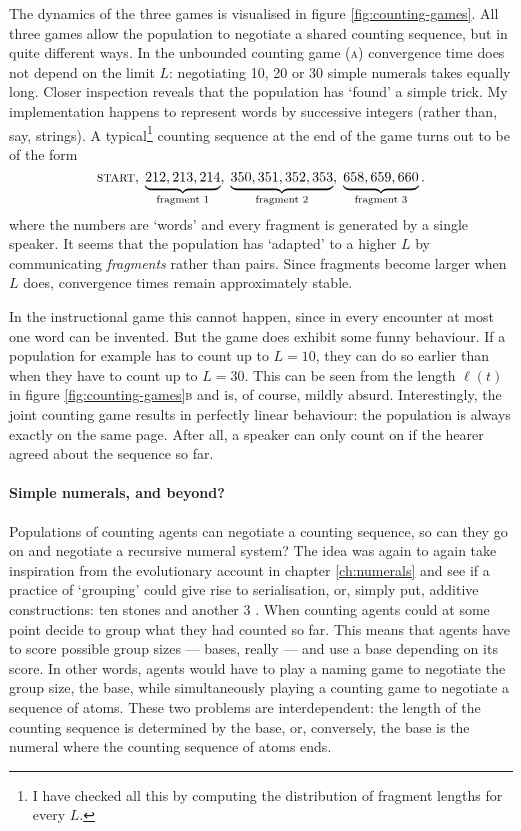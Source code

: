 \documentclass{../src/bcthesispart}
\begin{document}
The dynamics of the three games is visualised in figure \ref{fig:counting-games}.
All three games allow the population to negotiate a shared counting sequence, but in quite different ways.
In the unbounded counting game (\textsc{a}) convergence time does not depend on the limit $L$: negotiating 10, 20 or 30 simple numerals takes equally long.
Closer inspection reveals that the population has ‘found’ a simple trick.
My implementation happens to represent words by successive integers (rather than, say,  strings). 
A typical\footnote{%
	I have checked all this by computing the distribution of fragment lengths for every $L$.
	} counting sequence at the end of the game turns out to be of the form
\[
	\textsc{start}, \;
	\underbrace{212, 213, 214}_{\text{fragment 1}}, \; 
	\underbrace{350, 351, 352, 353}_{\text{fragment 2}}, \;
	\underbrace{658, 659, 660}_{\text{fragment 3}}.
\]
where the numbers are ‘words’ and every fragment is generated by a single speaker. 
It seems that the population has ‘adapted’ to a higher $L$ by communicating \emph{fragments} rather than pairs.
Since fragments become larger when $L$ does, convergence times remain approximately stable. 



In the instructional game this cannot happen, since in every encounter at most one word can be invented.
But the game does exhibit some funny behaviour.
If a population for example has to count up to $L=10$, they can do so earlier than when they have to count up to $L=30$. This can be seen from the length $\ell(t)$ in figure \ref{fig:counting-games}\textsc{b} and is, of course, mildly absurd.
Interestingly, the joint counting game results in perfectly linear behaviour: the population is always exactly on the same page.
After all, a speaker can only count on if the hearer agreed about the sequence so far.



\paragraph{Simple numerals, and beyond?}

Populations of counting agents can negotiate a counting sequence, so can they go on and negotiate a recursive numeral system?
The idea was again to again take inspiration from the evolutionary account in chapter \ref{ch:numerals} and see if a practice of ‘grouping’ could give rise to serialisation, or, simply put, additive constructions: ten stones and another 3 \parencite{Hurford2007}.
When counting agents could at some point decide to group what they had counted so far. 
This means that agents have to score possible group sizes — bases, really — and use a base depending on its score.
In other words, agents would have to play a naming game to negotiate the group size, the base, while simultaneously playing a counting game to negotiate a sequence of atoms.
These two problems are interdependent: the length of the counting sequence is determined by the base, or, conversely, the base is the numeral where the counting sequence of atoms ends.
\end{document}
